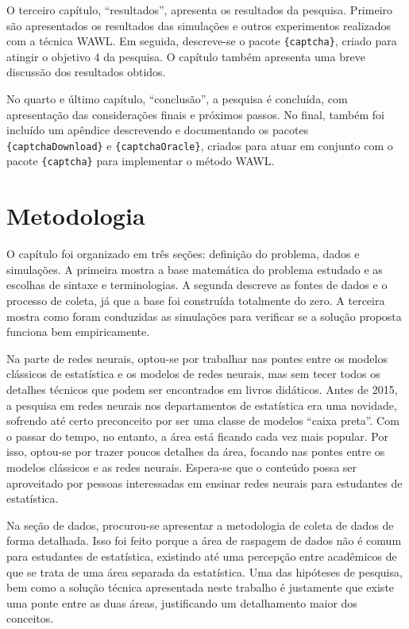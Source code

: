 \documentclass[12pt,twoside,brazilian]{book}
\begin{document}
O terceiro capítulo, ``resultados'', apresenta os resultados da
pesquisa. Primeiro são apresentados os resultados das simulações e
outros experimentos realizados com a técnica WAWL. Em seguida,
descreve-se o pacote \texttt{\{captcha\}}, criado para atingir o
objetivo 4 da pesquisa. O capítulo também apresenta uma breve discussão
dos resultados obtidos.

No quarto e último capítulo, ``conclusão'', a pesquisa é concluída, com
apresentação das considerações finais e próximos passos. No final,
também foi incluído um apêndice descrevendo e documentando os pacotes
\texttt{\{captchaDownload\}} e \texttt{\{captchaOracle\}}, criados para
atuar em conjunto com o pacote \texttt{\{captcha\}} para implementar o
método WAWL.


\hypertarget{sec-metodologia}{%
\chapter{Metodologia}\label{sec-metodologia}}


O capítulo foi organizado em três seções: definição do problema, dados e
simulações. A primeira mostra a base matemática do problema estudado e
as escolhas de sintaxe e terminologias. A segunda descreve as fontes de
dados e o processo de coleta, já que a base foi construída totalmente do
zero. A terceira mostra como foram conduzidas as simulações para
verificar se a solução proposta funciona bem empiricamente.

Na parte de redes neurais, optou-se por trabalhar nas pontes entre os
modelos clássicos de estatística e os modelos de redes neurais, mas sem
tecer todos os detalhes técnicos que podem ser encontrados em livros
didáticos. Antes de 2015, a pesquisa em redes neurais nos departamentos
de estatística era uma novidade, sofrendo até certo preconceito por ser
uma classe de modelos ``caixa preta''. Com o passar do tempo, no
entanto, a área está ficando cada vez mais popular. Por isso, optou-se
por trazer poucos detalhes da área, focando nas pontes entre os modelos
clássicos e as redes neurais. Espera-se que o conteúdo possa ser
aproveitado por pessoas interessadas em ensinar redes neurais para
estudantes de estatística.

Na seção de dados, procurou-se apresentar a metodologia de coleta de
dados de forma detalhada. Isso foi feito porque a área de raspagem de
dados não é comum para estudantes de estatística, existindo até uma
percepção entre acadêmicos de que se trata de uma área separada da
estatística. Uma das hipóteses de pesquisa, bem como a solução técnica
apresentada neste trabalho é justamente que existe uma ponte entre as
duas áreas, justificando um detalhamento maior dos conceitos.
\end{document}
